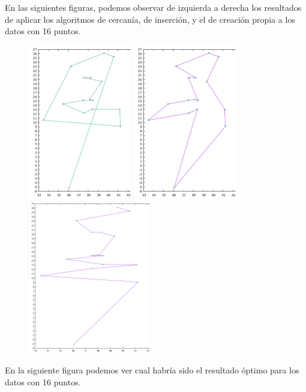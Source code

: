 \documentclass[11pt,a4paper]{article} %
\begin{document}
En las siguientes figuras, podemos observar de izquierda a derecha los resultados de aplicar los algoritmos de cercanía, de inserción, y el de creación propia a los datos con 16 puntos.

\begin{figure}[H]
	\includegraphics[width=4.5cm]{data/graphics/comparacion/cercania.png}
	\includegraphics[width=4.5cm]{data/graphics/comparacion/insercion.png}
	\includegraphics[width=5.35cm]{data/graphics/comparacion/otro.png}
\end{figure}

En la siguiente figura podemos ver cual habría sido el resultado óptimo para los datos con 16 puntos.
\end{document}
